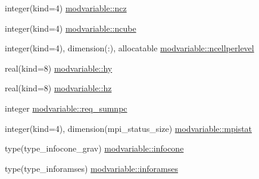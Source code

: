 \begin{DoxyCompactItemize}
\item 
integer(kind=4) \hyperlink{namespacemodvariable_ad8d90278c9709b9db15059e8c320feb4}{modvariable\+::ncz}
\item 
integer(kind=4) \hyperlink{namespacemodvariable_a718efb76ffcda6b833e85642669fd01e}{modvariable\+::ncube}
\item 
integer(kind=4), dimension(\+:), allocatable \hyperlink{namespacemodvariable_ab27c6baa1a2f6fe45974edb46a27bd93}{modvariable\+::ncellperlevel}
\item 
real(kind=8) \hyperlink{namespacemodvariable_a56edfdc4b391ae52b9bcce691c5119d5}{modvariable\+::hy}
\item 
real(kind=8) \hyperlink{namespacemodvariable_a40a10b2561275758f13b237235540ea9}{modvariable\+::hz}
\item 
integer \hyperlink{namespacemodvariable_adfc8585ffcde6504507af946c0afbea8}{modvariable\+::req\+\_\+sumnpc}
\item 
integer(kind=4), dimension(mpi\+\_\+status\+\_\+size) \hyperlink{namespacemodvariable_a9d7821389828ef466b9e1fcffd62dd76}{modvariable\+::mpistat}
\item 
type(type\+\_\+infocone\+\_\+grav) \hyperlink{namespacemodvariable_ab4ad6d71e8fdf948a8a42eb594ed9930}{modvariable\+::infocone}
\item 
type(type\+\_\+inforamses) \hyperlink{namespacemodvariable_a2742babfa57f89ec1dc1afd6852dc04e}{modvariable\+::inforamses}
\end{DoxyCompactItemize}
